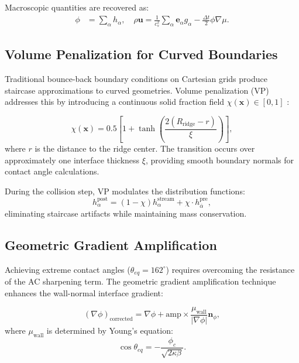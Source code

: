 Macroscopic quantities are recovered as:
\begin{align}
    \phi &= \sum_\alpha h_\alpha, \quad
    \rho \mathbf{u} = \frac{1}{c_s^2} \sum_\alpha \mathbf{e}_\alpha g_\alpha - \frac{\Delta t}{2} \phi \nabla \mu.
    \label{eq:macro_recover}
\end{align}

\subsection{Volume Penalization for Curved Boundaries}

Traditional bounce-back boundary conditions on Cartesian grids produce staircase approximations to curved geometries. Volume penalization (VP) addresses this by introducing a continuous solid fraction field $\chi(\mathbf{x}) \in [0,1]$ \cite{song2022volume}:

\begin{equation}
    \chi(\mathbf{x}) = 0.5 \left[ 1 + \tanh\left( \frac{2(R_{\text{ridge}} - r)}{\xi} \right) \right],
    \label{eq:chi_smoothing}
\end{equation}
where $r$ is the distance to the ridge center. The transition occurs over approximately one interface thickness $\xi$, providing smooth boundary normals for contact angle calculations.

During the collision step, VP modulates the distribution functions:
\begin{equation}
    h_\alpha^{\text{post}} = (1 - \chi) h_\alpha^{\text{stream}} + \chi \cdot h_{\bar{\alpha}}^{\text{pre}},
    \label{eq:vp_collision}
\end{equation}
eliminating staircase artifacts while maintaining mass conservation.

\subsection{Geometric Gradient Amplification}

Achieving extreme contact angles ($\theta_{eq} = 162^\circ$) requires overcoming the resistance of the AC sharpening term. The geometric gradient amplification technique enhances the wall-normal interface gradient:

\begin{equation}
    (\nabla \phi)_{\text{corrected}} = \nabla \phi + \text{amp} \times \frac{\mu_{\text{wall}}}{|\nabla \phi|} \mathbf{n}_\phi,
    \label{eq:amp_correction}
\end{equation}
where $\mu_{\text{wall}}$ is determined by Young's equation:
\begin{equation}
    \cos \theta_{eq} = -\frac{\phi_c}{\sqrt{2\kappa\beta}}.
    \label{eq:young_equation}
\end{equation}

